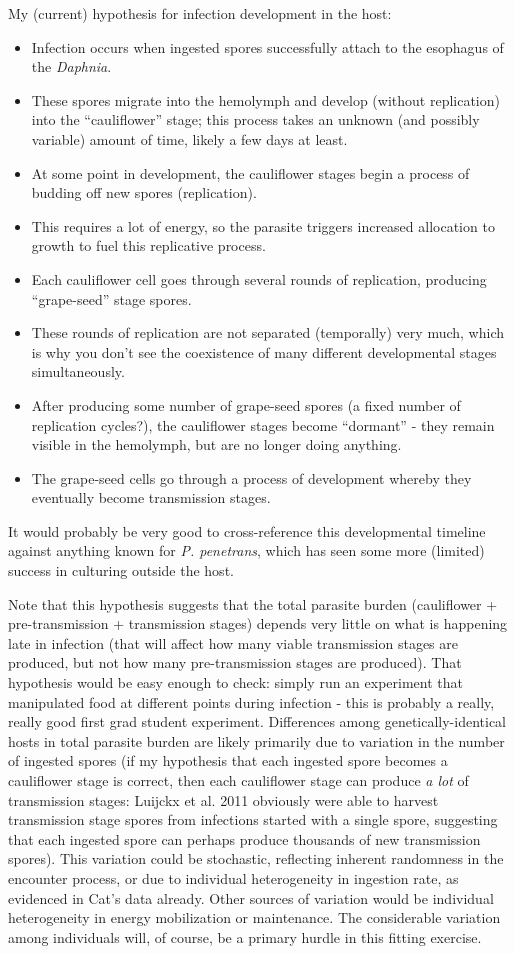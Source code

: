 \documentclass[12pt,reqno,final,pdftex]{amsart}\usepackage[]{graphicx}\usepackage[]{color}
\theoremstyle{plain}
\numberwithin{equation}{part}
\begin{document}
My (current) hypothesis for infection development in the host:
\begin{itemize}
\item Infection occurs when ingested spores successfully attach to the esophagus of the \emph{Daphnia}.
\item These spores migrate into the hemolymph and develop (without replication) into the ``cauliflower'' stage; this process takes an unknown (and possibly variable) amount of time, likely a few days at least.
\item At some point in development, the cauliflower stages begin a process of budding off new spores (replication).
\item This requires a lot of energy, so the parasite triggers increased allocation to growth to fuel this replicative process.
\item Each cauliflower cell goes through several rounds of replication, producing ``grape-seed'' stage spores.
\item These rounds of replication are not separated (temporally) very much, which is why you don't see the coexistence of many different developmental stages simultaneously.
\item After producing some number of grape-seed spores (a fixed number of replication cycles?), the cauliflower stages become ``dormant'' - they remain visible in the hemolymph, but are no longer doing anything.
\item The grape-seed cells go through a process of development whereby they eventually become transmission stages.
\end{itemize}
It would probably be very good to cross-reference this developmental timeline against anything known for \emph{P. penetrans}, which has seen some more (limited) success in culturing outside the host.

Note that this hypothesis suggests that the total parasite burden (cauliflower + pre-transmission + transmission stages) depends very little on what is happening late in infection (that will affect how many viable transmission stages are produced, but not how many pre-transmission stages are produced).
That hypothesis would be easy enough to check: simply run an experiment that manipulated food at different points during infection - this is probably a really, really good first grad student experiment.
Differences among genetically-identical hosts in total parasite burden are likely primarily due to variation in the number of ingested spores (if my hypothesis that each ingested spore becomes a cauliflower stage is correct, then each cauliflower stage can produce \emph{a lot} of transmission stages: Luijckx et al. 2011 obviously were able to harvest transmission stage spores from infections started with a single spore, suggesting that each ingested spore can perhaps produce thousands of new transmission spores).
This variation could be stochastic, reflecting inherent randomness in the encounter process, or due to individual heterogeneity in ingestion rate, as evidenced in Cat's data already.
Other sources of variation would be individual heterogeneity in energy mobilization or maintenance.
The considerable variation among individuals will, of course, be a primary hurdle in this fitting exercise.
\end{document}
